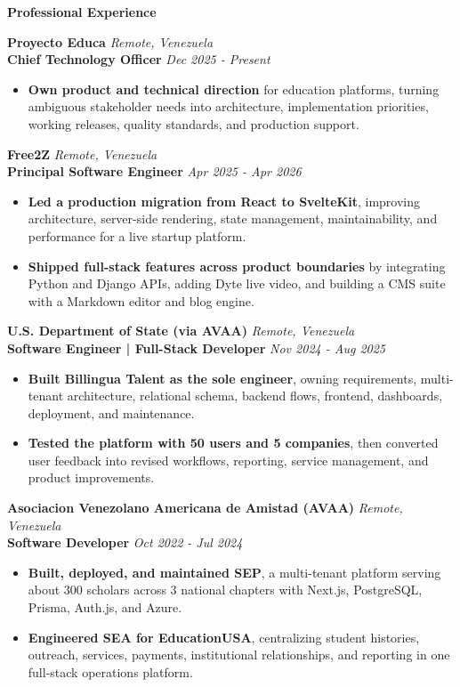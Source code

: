 \documentclass[10pt]{article}
\newcommand{\sectiontitle}[1]{%
    \vspace{3pt}
    \begin{center}
        \textbf{#1}
    \end{center}
    \vspace{-7pt}
}
\begin{document}
\sectiontitle{Professional Experience}

\textbf{Proyecto Educa} \hfill \textit{Remote, Venezuela} \\
\textbf{Chief Technology Officer} \hfill \textit{Dec 2025 - Present}
\begin{itemize}
    \item \textbf{Own product and technical direction} for education platforms, turning ambiguous stakeholder needs into architecture, implementation priorities, working releases, quality standards, and production support.
\end{itemize}

\vspace{2pt}
\textbf{Free2Z} \hfill \textit{Remote, Venezuela} \\
\textbf{Principal Software Engineer} \hfill \textit{Apr 2025 - Apr 2026}
\begin{itemize}
    \item \textbf{Led a production migration from React to SvelteKit}, improving architecture, server-side rendering, state management, maintainability, and performance for a live startup platform.
    \item \textbf{Shipped full-stack features across product boundaries} by integrating Python and Django APIs, adding Dyte live video, and building a CMS suite with a Markdown editor and blog engine.
\end{itemize}

\vspace{2pt}
\textbf{U.S. Department of State (via AVAA)} \hfill \textit{Remote, Venezuela} \\
\textbf{Software Engineer | Full-Stack Developer} \hfill \textit{Nov 2024 - Aug 2025}
\begin{itemize}
    \item \textbf{Built Billingua Talent as the sole engineer}, owning requirements, multi-tenant architecture, relational schema, backend flows, frontend, dashboards, deployment, and maintenance.
    \item \textbf{Tested the platform with 50 users and 5 companies}, then converted user feedback into revised workflows, reporting, service management, and product improvements.
\end{itemize}

\vspace{2pt}
\textbf{Asociacion Venezolano Americana de Amistad (AVAA)} \hfill \textit{Remote, Venezuela} \\
\textbf{Software Developer} \hfill \textit{Oct 2022 - Jul 2024}
\begin{itemize}
    \item \textbf{Built, deployed, and maintained SEP}, a multi-tenant platform serving about 300 scholars across 3 national chapters with Next.js, PostgreSQL, Prisma, Auth.js, and Azure.
    \item \textbf{Engineered SEA for EducationUSA}, centralizing student histories, outreach, services, payments, institutional relationships, and reporting in one full-stack operations platform.
\end{itemize}
\end{document}
